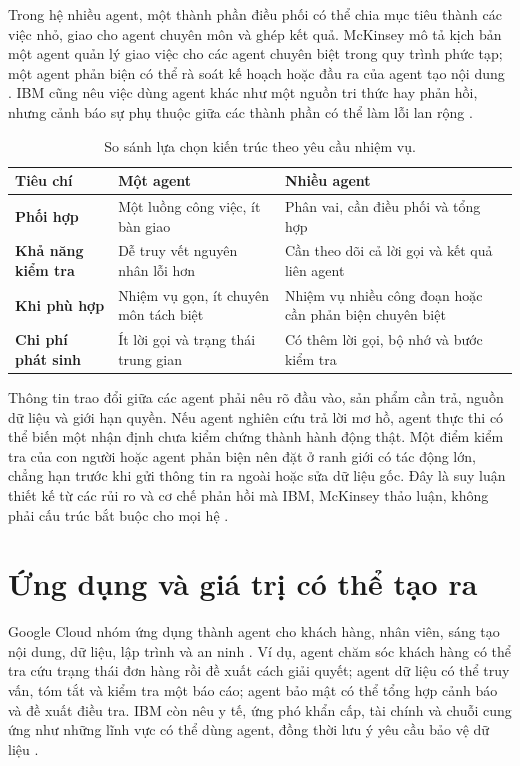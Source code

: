 \documentclass[12pt,a4paper]{report}
\begin{document}
Trong hệ nhiều agent, một thành phần điều phối có thể chia mục tiêu thành các việc
nhỏ, giao cho agent chuyên môn và ghép kết quả. McKinsey mô tả kịch bản một agent
quản lý giao việc cho các agent chuyên biệt trong quy trình phức tạp; một agent phản
biện có thể rà soát kế hoạch hoặc đầu ra của agent tạo nội dung \cite{mckinsey}.
IBM cũng nêu việc dùng agent khác như một nguồn tri thức hay phản hồi, nhưng cảnh
báo sự phụ thuộc giữa các thành phần có thể làm lỗi lan rộng \cite{ibm}.

\begin{table}[H]
\centering
\small
\caption{So sánh lựa chọn kiến trúc theo yêu cầu nhiệm vụ.}
\begin{tabularx}{\textwidth}{>{\bfseries}p{3.0cm}XX}
\toprule
Tiêu chí & Một agent & Nhiều agent \\
\midrule
Phối hợp & Một luồng công việc, ít bàn giao & Phân vai, cần điều phối và tổng hợp \\
Khả năng kiểm tra & Dễ truy vết nguyên nhân lỗi hơn & Cần theo dõi cả lời gọi và kết quả liên agent \\
Khi phù hợp & Nhiệm vụ gọn, ít chuyên môn tách biệt & Nhiệm vụ nhiều công đoạn hoặc cần phản biện chuyên biệt \\
Chi phí phát sinh & Ít lời gọi và trạng thái trung gian & Có thêm lời gọi, bộ nhớ và bước kiểm tra \\
\bottomrule
\end{tabularx}
\end{table}

Thông tin trao đổi giữa các agent phải nêu rõ đầu vào, sản phẩm cần trả, nguồn dữ
liệu và giới hạn quyền. Nếu agent nghiên cứu trả lời mơ hồ, agent thực thi có thể
biến một nhận định chưa kiểm chứng thành hành động thật. Một điểm kiểm tra của con
người hoặc agent phản biện nên đặt ở ranh giới có tác động lớn, chẳng hạn trước
khi gửi thông tin ra ngoài hoặc sửa dữ liệu gốc. Đây là suy luận thiết kế từ các
rủi ro và cơ chế phản hồi mà IBM, McKinsey thảo luận, không phải cấu trúc bắt buộc
cho mọi hệ \cite{ibm,mckinsey}.

\section{Ứng dụng và giá trị có thể tạo ra}
Google Cloud nhóm ứng dụng thành agent cho khách hàng, nhân viên, sáng tạo nội dung,
dữ liệu, lập trình và an ninh \cite{google}. Ví dụ, agent chăm sóc khách hàng có thể
tra cứu trạng thái đơn hàng rồi đề xuất cách giải quyết; agent dữ liệu có thể truy vấn,
tóm tắt và kiểm tra một báo cáo; agent bảo mật có thể tổng hợp cảnh báo và đề xuất
điều tra. IBM còn nêu y tế, ứng phó khẩn cấp, tài chính và chuỗi cung ứng như những
lĩnh vực có thể dùng agent, đồng thời lưu ý yêu cầu bảo vệ dữ liệu \cite{ibm}.
\end{document}
